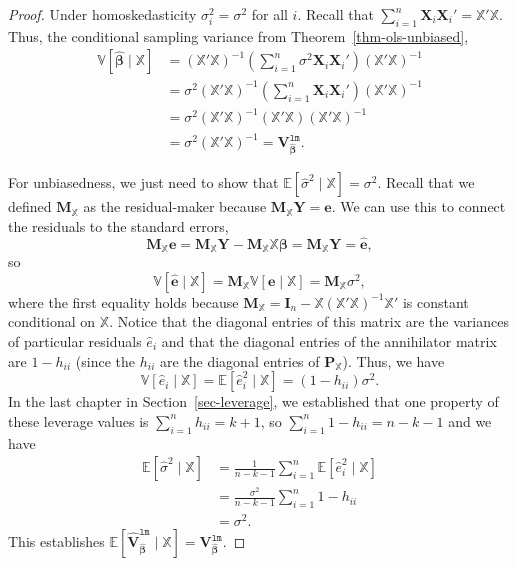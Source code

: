 \documentclass[
  13pt,
  letterpaper,
  DIV=11,
  numbers=noendperiod]{scrreprt}
\newcommand{\mb}{\symbf}
\newcommand{\E}{\mathbb{E}}
\newcommand{\V}{\mathbb{V}}
\newcommand{\X}{\mb{X}}
\newcommand{\Xmat}{\mathbb{X}}
\newcommand{\bfbeta}{\mb{\beta}}
\newcommand{\bhat}{\widehat{\mb{\beta}}}
\theoremstyle{definition}
\theoremstyle{definition}
\theoremstyle{plain}
\theoremstyle{remark}
\begin{document}
\begin{proof}
Under homoskedasticity \(\sigma^2_i = \sigma^2\) for all \(i\). Recall
that \(\sum_{i=1}^n \X_i\X_i' = \Xmat'\Xmat\). Thus, the conditional
sampling variance from Theorem~\ref{thm-ols-unbiased}, \[ 
\begin{aligned}
\V[\bhat \mid \Xmat] &= \left( \Xmat'\Xmat \right)^{-1}\left( \sum_{i=1}^n \sigma^2 \X_i\X_i' \right) \left( \Xmat'\Xmat \right)^{-1} \\ &= \sigma^2\left( \Xmat'\Xmat \right)^{-1}\left( \sum_{i=1}^n \X_i\X_i' \right) \left( \Xmat'\Xmat \right)^{-1} \\&= \sigma^2\left( \Xmat'\Xmat \right)^{-1}\left( \Xmat'\Xmat \right) \left( \Xmat'\Xmat \right)^{-1} \\&= \sigma^2\left( \Xmat'\Xmat \right)^{-1} = \mb{V}^{\texttt{lm}}_{\bhat}.
\end{aligned}
\]

For unbiasedness, we just need to show that
\(\E[\widehat{\sigma}^{2} \mid \Xmat] = \sigma^2\). Recall that we
defined \(\mb{M}_{\Xmat}\) as the residual-maker because
\(\mb{M}_{\Xmat}\mb{Y} = \widehat{\mb{e}}\). We can use this to connect
the residuals to the standard errors, \[ 
\mb{M}_{\Xmat}\mb{e} = \mb{M}_{\Xmat}\mb{Y} - \mb{M}_{\Xmat}\Xmat\bfbeta = \mb{M}_{\Xmat}\mb{Y} = \widehat{\mb{e}},
\] so \[
\V[\widehat{\mb{e}} \mid \Xmat] = \mb{M}_{\Xmat}\V[\mb{e} \mid \Xmat] = \mb{M}_{\Xmat}\sigma^2,
\] where the first equality holds because
\(\mb{M}_{\Xmat} = \mb{I}_{n} - \Xmat (\Xmat'\Xmat)^{-1} \Xmat'\) is
constant conditional on \(\Xmat\). Notice that the diagonal entries of
this matrix are the variances of particular residuals \(\widehat{e}_i\)
and that the diagonal entries of the annihilator matrix are
\(1 - h_{ii}\) (since the \(h_{ii}\) are the diagonal entries of
\(\mb{P}_{\Xmat}\)). Thus, we have \[ 
\V[\widehat{e}_i \mid \Xmat] = \E[\widehat{e}_{i}^{2} \mid \Xmat] = (1 - h_{ii})\sigma^{2}.
\] In the last chapter in Section~\ref{sec-leverage}, we established
that one property of these leverage values is
\(\sum_{i=1}^n h_{ii} = k+ 1\), so
\(\sum_{i=1}^n 1- h_{ii} = n - k - 1\) and we have \[ 
\begin{aligned}
  \E[\widehat{\sigma}^{2} \mid \Xmat] &= \frac{1}{n-k-1} \sum_{i=1}^{n} \E[\widehat{e}_{i}^{2} \mid \Xmat] \\
                                      &= \frac{\sigma^{2}}{n-k-1} \sum_{i=1}^{n} 1 - h_{ii} \\
                                      &= \sigma^{2}. 
\end{aligned}
\] This establishes
\(\E[\widehat{\mb{V}}^{\texttt{lm}}_{\bhat} \mid \Xmat] = \mb{V}^{\texttt{lm}}_{\bhat}\).
\end{proof}
\end{document}
